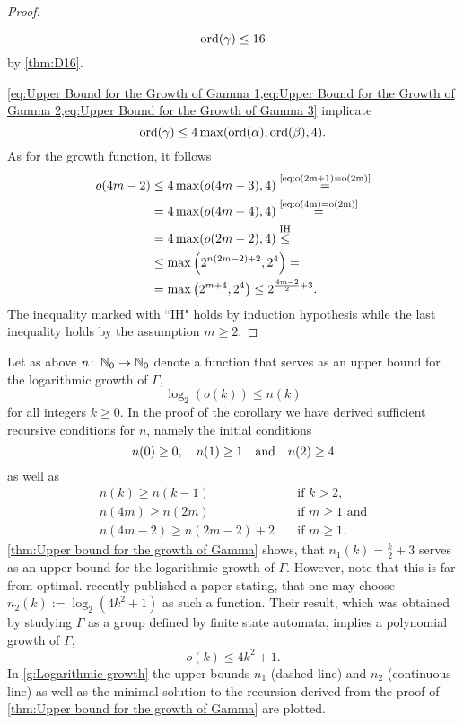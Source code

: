 \begin{proof}
\begin{clist}
\begin{equation}
\operatorname{\mathrm{ord}}(\gamma)\leq 16
\end{equation}
by \cref{thm:D16}.
\end{clist}
\cref{eq:Upper Bound for the Growth of Gamma 1,eq:Upper Bound for the Growth of Gamma 2,eq:Upper Bound for the Growth of Gamma 3} implicate
\begin{equation*}
\operatorname{\mathrm{ord}}(\gamma)\leq4\max(\operatorname{\mathrm{ord}}(\alpha), \operatorname{\mathrm{ord}}(\beta), 4).
\end{equation*}
As for the growth function, it follows
\begin{align*}
o(4m-2)	&\leq 4\max(o(4m-3),4)\overset{\text{\cref{eq:o(2m+1)=o(2m)}}}{=}\\
		&= 4\max(o(4m-4),4)\overset{\text{\cref{eq:o(4m)=o(2m)}}}{=}\\
		&=4\max(o(2m-2),4)\overset{\text{IH}}{\leq}\\
		&\leq \max\left(2^{n(2m-2)+2}, 2^4\right)=\\
		&=\max\left(2^{m+4},2^4\right)\leq 2^{\frac{4m-2}{2}+3}.
\end{align*}
The inequality marked with ``IH" holds by induction hypothesis while the last inequality holds by the assumption $m\geq 2$.
\end{proof}

Let as above $n\colon\operatorname{\mathbb{N}}_0\to\operatorname{\mathbb{N}}_0$ denote a function that serves as an upper bound for the logarithmic growth of $\Gamma$, \ie
\begin{equation*}
\log_2(o(k))\leq n(k)
\end{equation*}
for all integers $k\geq 0$. In the proof of the corollary we have derived sufficient recursive conditions for $n$, namely the initial conditions
\begin{equation*}
n(0)\geq 0,\quad n(1)\geq 1\quad \text{and}\quad n(2)\geq 4\\
\end{equation*}
as well as
\begin{align*}
n(k)\geq n(k-1)&\quad\text{if } k>2,\\
n(4m)\geq n(2m)&\quad\text{if } m\geq 1\text{ and}\\
n(4m-2)\geq n(2m-2)+2&\quad\text{if } m\geq 1.
\end{align*}
\cref{thm:Upper bound for the growth of Gamma} shows, that $n_1(k)=\frac{k}{2}+3$ serves as an upper bound for the logarithmic growth of $\Gamma$. However, note that this is far from optimal. \textcite{2006math} recently published a paper stating, that one may choose $n_2(k):=\log_2(4k^2+1)$ as such a function. Their result, which was obtained by studying $\Gamma$ as a group defined by finite state automata, implies a polynomial growth of $\Gamma$, \ie
\begin{equation*}
o(k)\leq 4k^2+1.
\end{equation*}
In \cref{g:Logarithmic growth} the upper bounds $n_1$ (dashed line) and $n_2$ (continuous line) as well as the minimal solution to the recursion derived from the proof of \cref{thm:Upper bound for the growth of Gamma} are plotted. 

